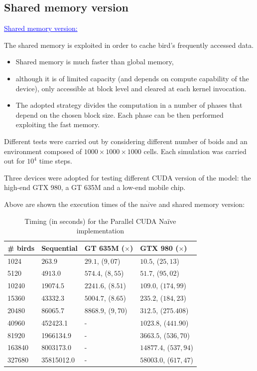 \documentclass{beamer}
\begin{document}
\subsection{Shared memory version}
\begin{frame}
\textcolor{blue}{\underline{Shared memory version:}}


The shared memory is exploited in order to cache
bird's frequently accessed data.
\begin{itemize}
\item Shared memory is much faster than global memory,
\item although it is of limited capacity (and
depends on compute capability of the device), only accessible at block level and cleared at
each kernel invocation.
\item The adopted strategy divides the computation in a number
of phases that depend on the chosen block size. Each phase
can be then performed exploiting the fast memory.
\end{itemize} 
Different tests were carried out  by considering
different number of boids and an environment composed of
$1000 \times 1000 \times 1000$ cells. Each simulation was carried out for
$10^4$ time steps.
\end{frame}
\begin{frame}
Three devices were adopted for testing different CUDA
version of the model: the high-end GTX 980, a GT 635M
and a low-end mobile chip.

Above are shown the execution times of the na$\ddot{i}$ve and shared memory version:

\begin{table} [h!]
	\centering
		\begin{tabular}{|l |l |l| l|}
	\hline
	\# birds & Sequential & GT	635M ($\times$) & GTX 980 ($\times$) 
	\\
	\hline
	
	1024  	& \(263.9\) 	& $29.1$, ($9,07$) 	& $10.5$, ($25,13$) \\
	5120  	& \(4913.0\) 	& $574.4$, ($8,55$) 	& $51.7$, ($95,02$)  \\
	10240 	&  $19074.5$ 	& $2241.6$, ($8.51$) 	& $109.0$, ($174,99$)  \\
	15360 	& \(43332.3\) 	& $5004.7$, ($8.65$) 	& $235.2$, ($184,23$)  \\
	20480  	& 86065.7 		& $8868.9$, ($9,70$) 	& $312.5$, ($275.408$) \\
	40960  	& 452423.1 		& - 						& $1023.8$, ($441.90$)  \\
	81920  	& 1966134.9 	& - 						& $3663.5$, ($536,70$)  \\
	163840  & 8003173.0 	& - 						& $14877.4$, ($537,94$)	 \\
	327680  & 35815012.0 	& - 						& $58003.0$, ($617,47$)  \\
	\hline
	\end{tabular}
	\caption{Timing (in seconds) for the Parallel CUDA Na\"ive implementation}
	\label{tab:naive}
\end{table}
\end{frame}
\end{document}
